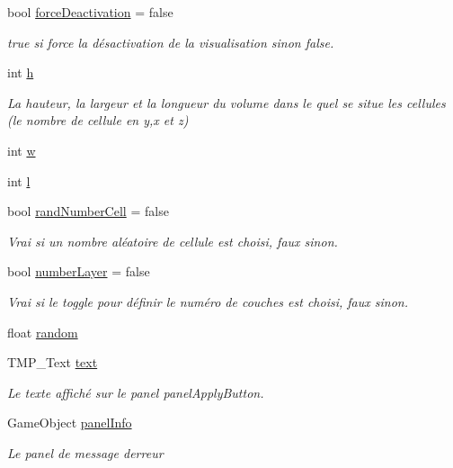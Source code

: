 \begin{DoxyCompactItemize}
bool \mbox{\hyperlink{class_edit_mode_manager_a2b9b6468cc837ee97b01202de2972129}{force\+Deactivation}} = false
\begin{DoxyCompactList}\small\item\em true si force la désactivation de la visualisation sinon false. \end{DoxyCompactList}\item 
int \mbox{\hyperlink{class_edit_mode_manager_ad0e09cececc48bcb4e7b768fa35dc954}{h}}
\begin{DoxyCompactList}\small\item\em La hauteur, la largeur et la longueur du volume dans le quel se situe les cellules (le nombre de cellule en y,x et z) \end{DoxyCompactList}\item 
int \mbox{\hyperlink{class_edit_mode_manager_ad9e4950cf24abf3ede8c0891c4df7b77}{w}}
\item 
int \mbox{\hyperlink{class_edit_mode_manager_a1979d9d74b3ead0806d3aa58f92a298c}{l}}
\item 
bool \mbox{\hyperlink{class_edit_mode_manager_a82186201a56d05f092efab0e79f2a78d}{rand\+Number\+Cell}} = false
\begin{DoxyCompactList}\small\item\em Vrai si un nombre aléatoire de cellule est choisi, faux sinon. \end{DoxyCompactList}\item 
bool \mbox{\hyperlink{class_edit_mode_manager_a0730066800d9fdb8d8872243bb0574ba}{number\+Layer}} = false
\begin{DoxyCompactList}\small\item\em Vrai si le toggle pour définir le numéro de couches est choisi, faux sinon. \end{DoxyCompactList}\item 
float \mbox{\hyperlink{class_edit_mode_manager_ad5ab7a25d17a19fee7eda1becfddb719}{random}}
\item 
T\+M\+P\+\_\+\+Text \mbox{\hyperlink{class_edit_mode_manager_ae6fc2f251b5813fc0c75330462b9dade}{text}}
\begin{DoxyCompactList}\small\item\em Le texte affiché sur le panel panel\+Apply\+Button. \end{DoxyCompactList}\item 
Game\+Object \mbox{\hyperlink{class_edit_mode_manager_a219384b34d903ef7872d37db677d5842}{panel\+Info}}
\begin{DoxyCompactList}\small\item\em Le panel de message d\textquotesingle{}erreur \end{DoxyCompactList}\item 

\end{DoxyCompactItemize}
